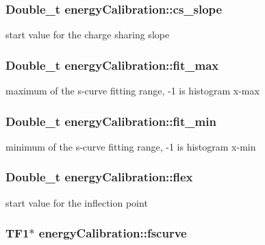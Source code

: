 \subsubsection{\setlength{\rightskip}{0pt plus 5cm}Double\_\-t \bf{energy\-Calibration::cs\_\-slope}\hspace{0.3cm}{\tt  [private]}}\label{classenergyCalibration_ca1efedbfea0ad5c9ea2d794e3fb368d}


start value for the charge sharing slope 
\subsubsection{\setlength{\rightskip}{0pt plus 5cm}Double\_\-t \bf{energy\-Calibration::fit\_\-max}\hspace{0.3cm}{\tt  [private]}}\label{classenergyCalibration_e979386a3f787ef706f4a9ec5bf41d7d}


maximum of the s-curve fitting range, -1 is histogram x-max 
\subsubsection{\setlength{\rightskip}{0pt plus 5cm}Double\_\-t \bf{energy\-Calibration::fit\_\-min}\hspace{0.3cm}{\tt  [private]}}\label{classenergyCalibration_262f574732186cdd8d3a11344d03d0bb}


minimum of the s-curve fitting range, -1 is histogram x-min 
\subsubsection{\setlength{\rightskip}{0pt plus 5cm}Double\_\-t \bf{energy\-Calibration::flex}\hspace{0.3cm}{\tt  [private]}}\label{classenergyCalibration_b99d770f1c9af68d591ed20847813ad1}


start value for the inflection point 
\subsubsection{\setlength{\rightskip}{0pt plus 5cm}TF1$\ast$ \bf{energy\-Calibration::fscurve}\hspace{0.3cm}{\tt  [private]}}\label{classenergyCalibration_57706a328324c25dd9f8ba6d1486e4ce}


